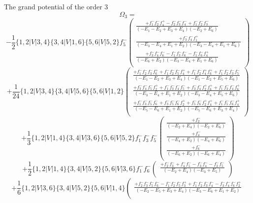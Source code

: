 \documentclass{article}
\begin{document}
The grand potential of the order 3
\[\Omega_{3} = \]
\[-\frac{1}{2}\{1,2|V|3,4\}\{3,4|V|1,6\}\{5,6|V|5,2\}f_{5}^{-}\left(\begin{array}{rcl}\frac{+f_{1}^{-}f_{2}^{-}f_{4}^{+}-f_{2}^{-}f_{3}^{-}f_{4}^{-}+f_{1}^{-}f_{2}^{-}f_{3}^{-}}{(-E_{1}-E_{2}+E_{3}+E_{4})(-E_{2}+E_{6})}\\
\frac{+f_{3}^{-}f_{4}^{-}f_{1}^{+}}{(-E_{3}-E_{4}+E_{1}+E_{2})(-E_{3}-E_{4}+E_{1}+E_{6})}\\
\frac{+f_{3}^{-}f_{4}^{-}f_{6}^{-}-f_{1}^{-}f_{3}^{-}f_{6}^{-}-f_{1}^{-}f_{6}^{-}f_{4}^{+}}{(-E_{6}+E_{2})(-E_{3}-E_{4}+E_{1}+E_{6})}\\
\end{array}\right)\]\[+\frac{1}{24}\{1,2|V|3,4\}\{3,4|V|5,6\}\{5,6|V|1,2\}\left(\begin{array}{rcl}\frac{+f_{1}^{-}f_{2}^{-}f_{3}^{-}f_{6}^{+}+f_{1}^{-}f_{2}^{-}f_{5}^{-}f_{4}^{+}+f_{1}^{-}f_{2}^{-}f_{4}^{+}f_{6}^{+}+f_{1}^{-}f_{2}^{-}f_{3}^{-}f_{5}^{-}}{(-E_{1}-E_{2}+E_{3}+E_{4})(-E_{1}-E_{2}+E_{5}+E_{6})}\\
\frac{+f_{3}^{-}f_{4}^{-}f_{5}^{-}f_{2}^{+}+f_{1}^{-}f_{3}^{-}f_{4}^{-}f_{5}^{-}+f_{3}^{-}f_{4}^{-}f_{2}^{+}f_{6}^{+}+f_{1}^{-}f_{3}^{-}f_{4}^{-}f_{6}^{+}}{(-E_{3}-E_{4}+E_{1}+E_{2})(-E_{3}-E_{4}+E_{5}+E_{6})}\\
\frac{+f_{1}^{-}f_{3}^{-}f_{5}^{-}f_{6}^{-}+f_{3}^{-}f_{5}^{-}f_{6}^{-}f_{2}^{+}+f_{5}^{-}f_{6}^{-}f_{2}^{+}f_{4}^{+}+f_{1}^{-}f_{5}^{-}f_{6}^{-}f_{4}^{+}}{(-E_{5}-E_{6}+E_{1}+E_{2})(-E_{5}-E_{6}+E_{3}+E_{4})}\\
\end{array}\right)\]\[+\frac{1}{3}\{1,2|V|1,4\}\{3,4|V|3,6\}\{5,6|V|5,2\}f_{1}^{-}f_{3}^{-}f_{5}^{-}\left(\begin{array}{rcl}\frac{+f_{2}^{-}}{(-E_{2}+E_{4})(-E_{2}+E_{6})}\\
\frac{+f_{4}^{-}}{(-E_{4}+E_{2})(-E_{4}+E_{6})}\\
\frac{+f_{6}^{-}}{(-E_{6}+E_{2})(-E_{6}+E_{4})}\\
\end{array}\right)\]\[+\frac{1}{2}\{1,2|V|1,4\}\{3,4|V|5,2\}\{5,6|V|3,6\}f_{1}^{-}f_{6}^{-}\left(\begin{array}{rcl}\frac{+f_{2}^{-}f_{3}^{-}+f_{4}^{-}f_{5}^{-}-f_{3}^{-}f_{4}^{-}-f_{2}^{-}f_{5}^{-}}{(-E_{2}+E_{4})(-E_{3}+E_{5})}\\
\end{array}\right)\]\[+\frac{1}{6}\{1,2|V|3,6\}\{3,4|V|5,2\}\{5,6|V|1,4\}\left(\begin{array}{rcl}\frac{+f_{2}^{-}f_{3}^{-}f_{5}^{-}f_{6}^{-}-f_{1}^{-}f_{2}^{-}f_{5}^{-}f_{3}^{+}+f_{1}^{-}f_{2}^{-}f_{3}^{-}f_{4}^{-}-f_{3}^{-}f_{4}^{-}f_{6}^{-}f_{2}^{+}}{(-E_{2}-E_{5}+E_{3}+E_{4})(-E_{3}-E_{6}+E_{1}+E_{2})}\\

\end{array}\]
\end{document}
